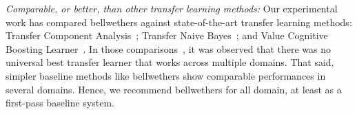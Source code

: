 \item [d.] {\em Comparable, or better, than   other 
transfer learning methods:} 
Our experimental work has compared bellwethers against state-of-the-art transfer learning methods:
Transfer Component Analysis~\cite{Nam13};
Transfer Naive Bayes~\cite{Ma2012}; and
 Value Cognitive Boosting Learner~\cite{vcboost16}.
 In those comparisons~\cite{krishna2018bellwethers},
 it was observed that
there was no universal best transfer learner that works across multiple domains. That said, simpler baseline methods like bellwethers show comparable performances in several domains. Hence, we recommend bellwethers for all domain, at
least as a first-pass baseline system.
\ei


